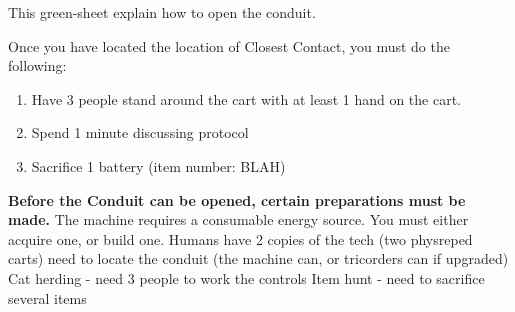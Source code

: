 \documentclass[green]{elementals}
\begin{document}
\name{\gConduit{}}

This green-sheet explain how to open the conduit.

Once you have located the location of Closest Contact, you must do the following:
\begin{enumerate}
  \item Have 3 people stand around the cart with at least 1 hand on the cart.
  \item Spend 1 minute discussing protocol
  \item Sacrifice 1 battery (item number: BLAH)
\end{enumerate}
{\bf Before the Conduit can be opened, certain preparations must be made.}
The machine requires a consumable energy source. You must either acquire one, or build one.
Humans have 2 copies of the tech (two physreped carts)
need to locate the conduit (the machine can, or tricorders can if upgraded)
Cat herding - need 3 people to work the controls
Item hunt - need to sacrifice several items
\end{document}
